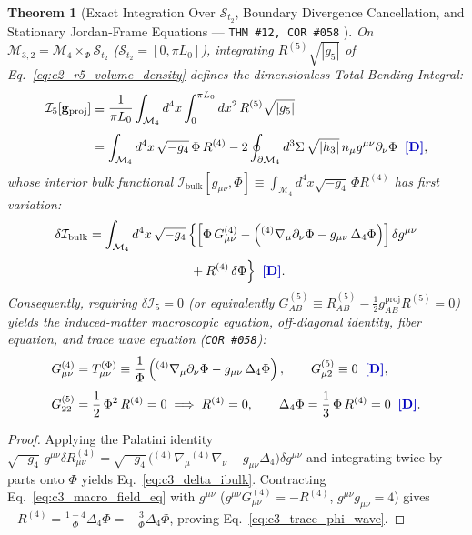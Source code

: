 \documentclass[11pt,a4paper]{article}
\newcommand{\catD}{\text{\textbf{\textcolor{blue!75!black}{[D]}}}}
\theoremstyle{definition}
\theoremstyle{plain}
\newtheorem{theorem}[axiom]{Theorem}
\theoremstyle{remark}
\begin{document}
\begin{theorem}[Exact Integration Over $\mathcal{S}_{t_2}$, Boundary Divergence Cancellation, and Stationary Jordan-Frame Equations --- \texttt{THM~\#12, COR~\#058} \catD]\label{thm:c3_i5_reduction}\label{thm:c3_stationary_field_equations}
On $\mathcal{M}_{3,2} = \mathcal{M}_4 \times_{\Phi} \mathcal{S}_{t_2}$ ($\mathcal{S}_{t_2} = [0, \pi L_0]$), integrating $R^{(5)}\sqrt{|g_5|}$ of Eq.~\eqref{eq:c2_r5_volume_density} defines the dimensionless Total Bending Integral:
\begin{align}
\mathcal{I}_5\!\left[\mathbf{g}_{\mathrm{proj}}\right] &\equiv \frac{1}{\pi L_0}\int_{\mathcal{M}_4} d^4x \int_{0}^{\pi L_0} dx^2\,R^{(5)}\sqrt{|g_5|} \nonumber \\[3pt]
&= \int_{\mathcal{M}_4} d^4x\,\sqrt{-g_4}\,\Phi\,R^{(4)} - 2\oint_{\partial\mathcal{M}_4} d^3\Sigma\,\sqrt{|h_3|}\,n_\mu g^{\mu\nu}\partial_\nu\Phi \;\;\catD, \label{eq:c3_i5_4d_split}
\end{align}
whose interior bulk functional $\mathcal{I}_{\mathrm{bulk}}[g_{\mu\nu}, \Phi] \equiv \int_{\mathcal{M}_4} d^4x\sqrt{-g_4}\,\Phi R^{(4)}$ has first variation:
\begin{align}
\delta\mathcal{I}_{\mathrm{bulk}} &= \int_{\mathcal{M}_4} d^4x\,\sqrt{-g_4}\,\Bigl\{\left[\Phi\,G_{\mu\nu}^{(4)} - \left({}^{(4)}\nabla_\mu\partial_\nu\Phi - g_{\mu\nu}\,\Delta_4\Phi\right)\right]\delta g^{\mu\nu} \nonumber \\[3pt]
&\qquad\qquad\qquad\qquad + R^{(4)}\,\delta\Phi\Bigr\} \;\;\catD. \label{eq:c3_delta_ibulk}
\end{align}
Consequently, requiring $\delta\mathcal{I}_5 = 0$ (or equivalently $G_{AB}^{(5)} \equiv R_{AB}^{(5)} - \frac{1}{2}g_{AB}^{\mathrm{proj}}R^{(5)} = 0$) yields the induced-matter macroscopic equation, off-diagonal identity, fiber equation, and trace wave equation (\texttt{COR~\#058}):
\begin{align}
G_{\mu\nu}^{(4)} &= T_{\mu\nu}^{(\Phi)} \equiv \frac{1}{\Phi}\left({}^{(4)}\nabla_\mu\partial_\nu\Phi - g_{\mu\nu}\,\Delta_4\Phi\right), \qquad
G_{\mu 2}^{(5)} \equiv 0 \;\;\catD, \label{eq:c3_macro_field_eq} \\[4pt]
G_{22}^{(5)} &= \frac{1}{2}\,\Phi^2\,R^{(4)} = 0 \implies R^{(4)} = 0, \qquad
\Delta_4\Phi = \frac{1}{3}\,\Phi\,R^{(4)} = 0 \;\;\catD. \label{eq:c3_trace_phi_wave}
\end{align}
\end{theorem}

\begin{proof}
Applying the Palatini identity $\sqrt{-g_4}\,g^{\mu\nu}\delta R_{\mu\nu}^{(4)} = \sqrt{-g_4}\big({}^{(4)}\nabla_\mu{}^{(4)}\nabla_\nu - g_{\mu\nu}\Delta_4\big)\delta g^{\mu\nu}$ and integrating twice by parts onto $\Phi$ yields Eq.~\eqref{eq:c3_delta_ibulk}. Contracting Eq.~\eqref{eq:c3_macro_field_eq} with $g^{\mu\nu}$ ($g^{\mu\nu}G_{\mu\nu}^{(4)} = -R^{(4)}$, $g^{\mu\nu}g_{\mu\nu} = 4$) gives $-R^{(4)} = \frac{1-4}{\Phi}\Delta_4\Phi = -\frac{3}{\Phi}\Delta_4\Phi$, proving Eq.~\eqref{eq:c3_trace_phi_wave}.
\end{proof}
\end{document}
